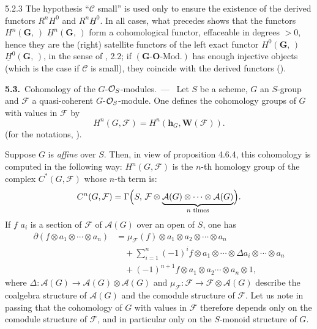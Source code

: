 \begin{remark}{5.2.3}
\label{I.5.2.3}
The hypothesis ``\(\mathcal{C}\) small'' is used only to ensure the existence
of the derived functors \(R^{n}H^{0}\) and \(R^{n}\underline{H}^{0}\). In all
cases, what precedes shows that the functors \(H^{n}(\mathbf{G},\,)\)
\resp \(\underline{H}^{n}(\mathbf{G},\,)\) form a cohomological functor,
effaceable in degrees \(>0\), hence they are the (right) satellite functors
of the left exact functor \(H^{0}(\mathbf{G},\,)\)
\resp \(\underline{H}^{0}(\mathbf{G},\,)\), in the sense of \cite{Gr57}, 2.2;
if \((\mathbf{G}\text{-}\mathbf{O}\text{-}\mathrm{Mod.})\) has enough injective
objects (which is the case if \(\mathcal{C}\) is small), they coincide with
the derived functors ().
\end{remark}

\par{}%
\noindent\textbf{5.3.}\ Cohomology of the \(G\)-\(\mathcal{O}_S\)-modules.\ ---\ \label{I.5.3}%
Let \(S\) be a scheme, \(G\) an \(S\)-group and \(\mathcal{F}\) a quasi-coherent
\(G\)-\(\mathcal{O}_S\)-module. One defines the cohomology groups of \(G\) with values in
\(\mathcal{F}\) by
\[
H^{n}(G,\mathcal{F})=H^{n}(\mathbf{h}_{G},\mathbf{W}(\mathcal{F})).
\]
(for the notations, ).

Suppose \(G\) is \emph{affine} over \(S\). Then, in view of proposition 4.6.4,
this cohomology is computed in the following way: \(H^{n}(G,\mathcal{F})\) is
the \(n\)-th homology group of the complex \(C^{*}(G,\mathcal{F})\) whose
\(n\)-th term is:
\[
C^{n}(G,\mathcal{F})
=\Gamma\Bigl(S,\,
\mathcal{F}\otimes
\underbrace{\mathcal{A}(G)\otimes\cdots\otimes\mathcal{A}(G)}_{n\text{ times}}\Bigr).
\]
If \(f\) \resp \(a_{i}\) is a section of \(\mathcal{F}\) \resp of
\(\mathcal{A}(G)\) over an open of \(S\), one has
\begin{align*}
\partial(f\otimes a_{1}\otimes\cdots\otimes a_{n})
&=\mu_{\mathcal{F}}(f)\otimes a_{1}\otimes a_{2}\otimes\cdots\otimes a_{n}\\
&\quad+\sum_{i=1}^{n}(-1)^{i}f\otimes a_{1}\otimes\cdots\otimes\Delta a_{i}\otimes\cdots\otimes a_{n}\\
&\quad+(-1)^{n+1}f\otimes a_{1}\otimes a_{2}\cdots\otimes a_{n}\otimes 1,
\end{align*}
where \(\Delta\colon\mathcal{A}(G)\to\mathcal{A}(G)\otimes\mathcal{A}(G)\) and
\(\mu_{\mathcal{F}}\colon\mathcal{F}\to\mathcal{F}\otimes\mathcal{A}(G)\)
describe the coalgebra structure of \(\mathcal{A}(G)\) and the comodule
structure of \(\mathcal{F}\). Let us note in passing that the cohomology of
\(G\) with values in \(\mathcal{F}\) therefore depends only on the comodule
structure of \(\mathcal{F}\), and in particular only on the \(S\)-monoid
structure of \(G\).

